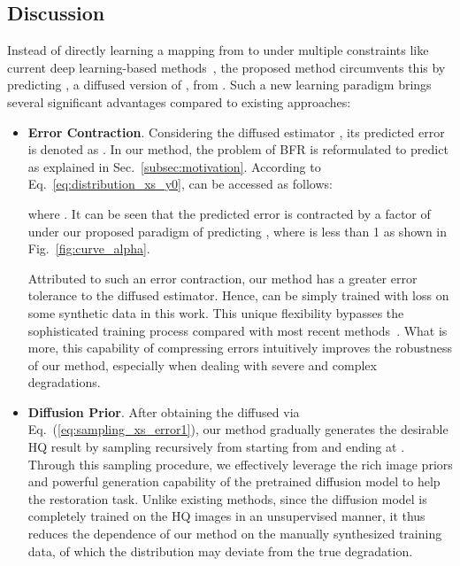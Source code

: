 \documentclass[10pt,twocolumn,letterpaper]{article}
\begin{document}
\subsection{Discussion} \label{subsec:remark}
Instead of directly learning a mapping from  to  under multiple constraints like current deep learning-based methods~\cite{chen2021progressive,yang2021gan,wang2021towards}, the proposed method circumvents this by predicting , a diffused version of , from . Such a new learning paradigm brings several significant advantages compared to existing approaches: 
\begin{itemize}[topsep=0pt,parsep=0pt,leftmargin=15pt]
    \item \textbf{Error Contraction}. Considering the diffused estimator , its predicted error is 
        denoted as . In our method, the problem of BFR is reformulated to predict  as explained in Sec.~\ref{subsec:motivation}. According to Eq.~\eqref{eq:distribution_xs_y0},
         can be accessed as follows:
        
        where .
        It can be seen that the predicted error  is contracted by a factor of  under our proposed paradigm of predicting ,
        where  is less than 1 as shown in Fig.~\ref{fig:curve_alpha}. 

        \vspace{1mm}
        Attributed to such an error contraction, our method has a greater error tolerance to the diffused estimator.
        Hence,  can be simply trained with  loss on some synthetic data in this work. This unique flexibility
        bypasses the sophisticated training process compared with most recent methods~\cite{li2020blind,wang2021towards,gu2022vqfr}. 
        What is more, this capability of compressing errors intuitively improves the robustness of our
        method, especially when dealing with severe and complex degradations.
\item \textbf{Diffusion Prior}. After obtaining the diffused  via Eq.~(\ref{eq:sampling_xs_error1}), our
        method gradually generates the desirable HQ result by sampling recursively from
         starting from  and ending at .
        Through this sampling procedure, we effectively leverage the rich image priors and powerful generation
        capability of the pretrained diffusion model to help the restoration task.
        Unlike existing methods, since the diffusion model is completely trained on the HQ images in an
        unsupervised manner, it thus reduces the dependence of our method on the manually synthesized
        training data, of which the distribution may deviate from the true degradation.
\end{itemize}
\end{document}
